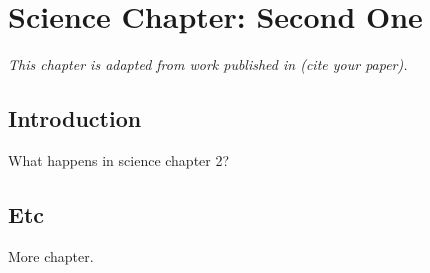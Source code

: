 \chapter{Science Chapter: Second One}
\label{chapter:science2}

\begin{center}
    \textit{This chapter is adapted from work published in (cite your paper).}
\end{center}

\section{Introduction}
What happens in science chapter 2?

\section{Etc}
More chapter.